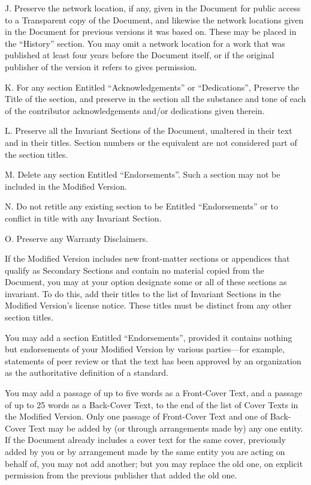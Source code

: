 J. Preserve the network location, if any, given in the Document for
public access to a Transparent copy of the Document, and likewise
the network locations given in the Document for previous versions
it was based on. These may be placed in the ``History'' section. You
may omit a network location for a work that was published at least
four years before the Document itself, or if the original publisher
of the version it refers to gives permission.

K. For any section Entitled ``Acknowledgements'' or ``Dedications'',
Preserve the Title of the section, and preserve in the section all
the substance and tone of each of the contributor acknowledgements
and/or dedications given therein.

L. Preserve all the Invariant Sections of the Document, unaltered
in their text and in their titles. Section numbers or the equivalent
are not considered part of the section titles.

M. Delete any section Entitled ``Endorsements''. Such a section may
not be included in the Modified Version.

N. Do not retitle any existing section to be Entitled ``Endorsements''
or to conflict in title with any Invariant Section.

O. Preserve any Warranty Disclaimers.

If the Modified Version includes new front-matter sections or appendices
that qualify as Secondary Sections and contain no material copied
from the Document, you may at your option designate some or all of
these sections as invariant. To do this, add their titles to the list
of Invariant Sections in the Modified Version's license notice. These
titles must be distinct from any other section titles.

You may add a section Entitled ``Endorsements'', provided it contains
nothing but endorsements of your Modified Version by various parties---for
example, statements of peer review or that the text has been approved
by an organization as the authoritative definition of a standard.

You may add a passage of up to five words as a Front-Cover Text, and
a passage of up to 25 words as a Back-Cover Text, to the end of the
list of Cover Texts in the Modified Version. Only one passage of Front-Cover
Text and one of Back-Cover Text may be added by (or through arrangements
made by) any one entity. If the Document already includes a cover
text for the same cover, previously added by you or by arrangement
made by the same entity you are acting on behalf of, you may not add
another; but you may replace the old one, on explicit permission from
the previous publisher that added the old one.

